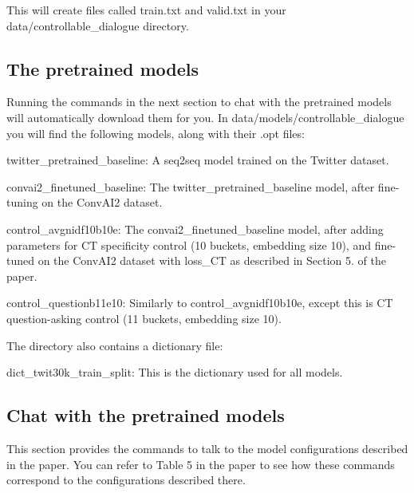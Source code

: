 This will create files called {\ttfamily train.\+txt} and {\ttfamily valid.\+txt} in your {\ttfamily data/controllable\+\_\+dialogue} directory.

\subsection*{The pretrained models}

Running the commands in the next section to chat with the pretrained models will automatically download them for you. In {\ttfamily data/models/controllable\+\_\+dialogue} you will find the following models, along with their {\ttfamily .opt} files\+:


\begin{DoxyItemize}
\item {\ttfamily twitter\+\_\+pretrained\+\_\+baseline}\+: A seq2seq model trained on the Twitter dataset.
\item {\ttfamily convai2\+\_\+finetuned\+\_\+baseline}\+: The {\ttfamily twitter\+\_\+pretrained\+\_\+baseline} model, after fine-\/tuning on the Conv\+A\+I2 dataset.
\item {\ttfamily control\+\_\+avgnidf10b10e}\+: The {\ttfamily convai2\+\_\+finetuned\+\_\+baseline} model, after adding parameters for CT specificity control (10 buckets, embedding size 10), and fine-\/tuned on the Conv\+A\+I2 dataset with loss\+\_\+\+CT as described in Section 5. of the paper.
\item {\ttfamily control\+\_\+questionb11e10}\+: Similarly to {\ttfamily control\+\_\+avgnidf10b10e}, except this is CT question-\/asking control (11 buckets, embedding size 10).
\end{DoxyItemize}

The directory also contains a dictionary file\+:


\begin{DoxyItemize}
\item {\ttfamily dict\+\_\+twit30k\+\_\+train\+\_\+split}\+: This is the dictionary used for all models.
\end{DoxyItemize}

\subsection*{Chat with the pretrained models}

This section provides the commands to talk to the model configurations described in the paper. You can refer to Table 5 in the paper to see how these commands correspond to the configurations described there.

